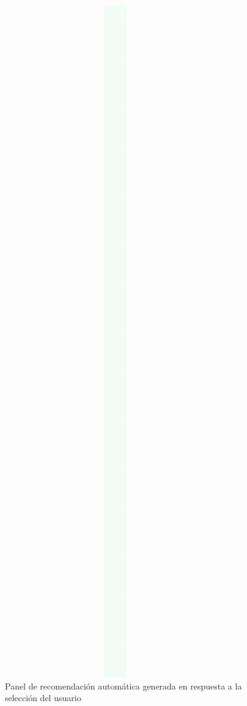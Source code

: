 \documentclass[12pt,a4paper]{report}
\begin{document}
\begin{figure}[h]
    \centering
    \includegraphics[width=0.85\textwidth]{Captura de pantalla 2025-06-26 121833.png}
    \caption{Panel de recomendación automática generada en respuesta a la selección del usuario}
    \label{fig:recomendacion}
\end{figure}
\end{document}

